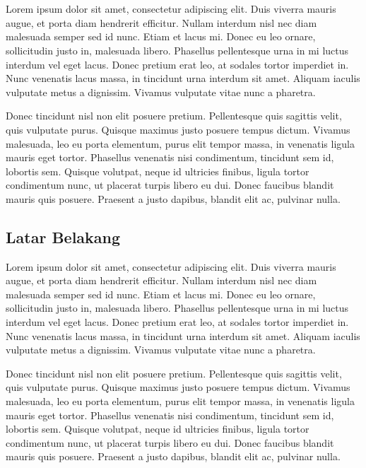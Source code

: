\chapter{\babSatu}
Lorem ipsum dolor sit amet, consectetur adipiscing elit. Duis viverra mauris augue, et porta diam hendrerit efficitur. Nullam interdum nisl nec diam malesuada semper sed id nunc. Etiam et lacus mi. Donec eu leo ornare, sollicitudin justo in, malesuada libero. Phasellus pellentesque urna in mi luctus interdum vel eget lacus. Donec pretium erat leo, at sodales tortor imperdiet in. Nunc venenatis lacus massa, in tincidunt urna interdum sit amet. Aliquam iaculis vulputate metus a dignissim. Vivamus vulputate vitae nunc a pharetra.

Donec tincidunt nisl non elit posuere pretium. Pellentesque quis sagittis velit, quis vulputate purus. Quisque maximus justo posuere tempus dictum. Vivamus malesuada, leo eu porta elementum, purus elit tempor massa, in venenatis ligula mauris eget tortor. Phasellus venenatis nisi condimentum, tincidunt sem id, lobortis sem. Quisque volutpat, neque id ultricies finibus, ligula tortor condimentum nunc, ut placerat turpis libero eu dui. Donec faucibus blandit mauris quis posuere. Praesent a justo dapibus, blandit elit ac, pulvinar nulla. 

\section{Latar Belakang}
Lorem ipsum dolor sit amet, consectetur adipiscing elit. Duis viverra mauris augue, et porta diam hendrerit efficitur. Nullam interdum nisl nec diam malesuada semper sed id nunc. Etiam et lacus mi. Donec eu leo ornare, sollicitudin justo in, malesuada libero. Phasellus pellentesque urna in mi luctus interdum vel eget lacus. Donec pretium erat leo, at sodales tortor imperdiet in. Nunc venenatis lacus massa, in tincidunt urna interdum sit amet. Aliquam iaculis vulputate metus a dignissim. Vivamus vulputate vitae nunc a pharetra.

Donec tincidunt nisl non elit posuere pretium. Pellentesque quis sagittis velit, quis vulputate purus. Quisque maximus justo posuere tempus dictum. Vivamus malesuada, leo eu porta elementum, purus elit tempor massa, in venenatis ligula mauris eget tortor. Phasellus venenatis nisi condimentum, tincidunt sem id, lobortis sem. Quisque volutpat, neque id ultricies finibus, ligula tortor condimentum nunc, ut placerat turpis libero eu dui. Donec faucibus blandit mauris quis posuere. Praesent a justo dapibus, blandit elit ac, pulvinar nulla. 


